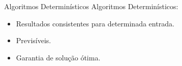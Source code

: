 \begin{frame}{Algoritmos Determinísticos}
    Algoritmos Determinísticos:

    \begin{itemize}
        \item Resultados consistentes para determinada entrada.
        \item Previsíveis.
        \item Garantia de solução ótima.
    \end{itemize}
\end{frame}